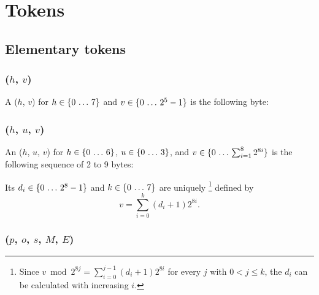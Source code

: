 
\section{Tokens}
\label{sec:tokens}

\subsection{Elementary tokens}

\subsubsection{($h$, $v$)}
\hypertarget{sec:def:MinimalToken}{}

A ($h$, $v$)
for $h \in \{0 \,\ldots\, 7\}$
and $v \in \{0 \,\ldots\, 2^5 - 1\}$
is the following byte:



\subsubsection{($h$, $u$, $v$)}
\hypertarget{sec:def:NaturalToken}{}

An ($h$, $u$, $v$)
for $h \in \{0 \,\ldots\, 6\}$,
$u \in \{0 \,\ldots\, 3\}$,
and $v \in \{0 \,\ldots\, \sum_{i = 1}^8 2^{8i}\}$
is the following sequence of 2 to 9 bytes:


Its $d_i \in \{0 \,\ldots\, 2^8 - 1\}$ and $k \in \{0 \,\ldots\, 7\}$ are uniquely%
\footnote{%
    Since $v \bmod 2^{8 j} = \sum_{i = 0}^{j - 1} (d_i + 1) 2^{8 i}$ for every $j$ with $0 < j \le k$,
    the $d_i$ can be calculated with increasing $i$.
}
defined by
\begin{equation}
    v =\sum_{i = 0}^k (d_i + 1) 2^{8 i}.
\end{equation}


\subsubsection{($p$, $o$, $s$, $M$, $E$)}
\hypertarget{sec:def:BinaryRationalToken}{}

